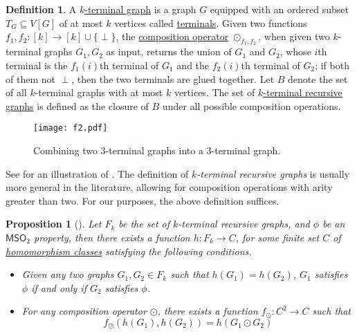 \documentclass[11pt]{article}
\newtheorem{proposition}[lemma]{Proposition}
\theoremstyle{definition}
\newtheorem{definition}[lemma]{Definition}
\theoremstyle{remark}
\newcommand{\MSO}{\mathsf{MSO}_2}
\begin{document}
\begin{definition}
    \label{terminal-recursive-gluing}
    A \underline{$k$-terminal graph} is a graph $G$ equipped with an ordered subset $T_G \subseteq V[G]$ of at most $k$ vertices called \ul{terminals}. Given two functions $f_1, f_2 : [k] \to [k] \cup \{\perp\}$, the \ul{composition operator} $\odot_{f_1, f_2}$, when given two $k$-terminal graphs $G_1, G_2$ as input, returns the union of $G_1$ and $G_2$, whose $i$th terminal is the $f_1(i)$th terminal of $G_1$ and the $f_2(i)$th terminal of $G_2$; if both of them not $\perp$, then the two terminals are glued together.
 Let $B$ denote the set of all $k$-terminal graphs with at most $k$ vertices. The set of \ul{$k$-terminal recursive graphs} is defined as the closure of $B$ under all possible composition operations.
\end{definition}

\begin{figure}[ht!]
    \centering
    \texttt{[image: f2.pdf]}
    \caption{Combining two $3$-terminal graphs into a $3$-terminal graph.}
    \label{fig:f2}
\end{figure}



See  for an illustration of . 
The definition of \emph{$k$-terminal recursive graphs} is usually more general in the literature, allowing for composition operations with arity greater than two.
For our purposes, the above definition suffices.
\begin{proposition}[{\cite{borie1992automatic,COURCELLE199012}}]
    \label{homomorphism-class-mapping}
    Let $F_k$ be the set of $k$-terminal recursive graphs, and $\phi$ be an $\MSO$ property, then there exists a function $h : F_k \to C$, for some finite set $C$ of \ul{homomorphism classes} satisfying the following conditions.
    \begin{itemize}
        \item Given any two graphs $G_1, G_2 \in F_k$ such that $h(G_1) = h(G_2)$, $G_1$ satisfies $\phi$ if and only if $G_2$ satisfies $\phi$.
        \item For any composition operator $\odot$, there exists a function $f_{\odot} : C^2 \to C$ such that 
        \[ f_{\odot}(h(G_1), h(G_2)) = h(G_1 \odot G_2)\]
    \end{itemize}
\end{proposition}
\end{document}
